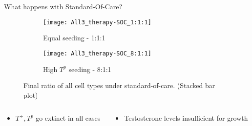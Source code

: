 \begin{frame}{What happens with Standard-Of-Care?}
  \begin{figure}[h]
    \begin{adjustwidth}{-5cm}{-5cm}
      \centering
      \begin{subfigure}[b]{0.53\textwidth}
        \centering
        \texttt{[image: All3\_therapy-SOC\_1:1:1]}
        \caption{Equal seeding - 1:1:1}
      \end{subfigure}
      \begin{subfigure}[b]{0.53\textwidth}
        \centering
        \texttt{[image: All3\_therapy-SOC\_8:1:1]}
        \caption{High $T^p$ seeding - 8:1:1}
      \end{subfigure}
    \end{adjustwidth}
    \caption{Final ratio of all cell types under standard-of-care. (Stacked bar plot)}
  \end{figure}
  \begin{columns}
    \begin{column}{0.5\textwidth}
      \begin{itemize}
        \item $T^+, T^p$ go extinct in all cases
      \end{itemize}
    \end{column}
    \begin{column}{0.5\textwidth}
      \begin{itemize}
        \item Testosterone levels insufficient for growth
      \end{itemize}
    \end{column}
  \end{columns}
\end{frame}

